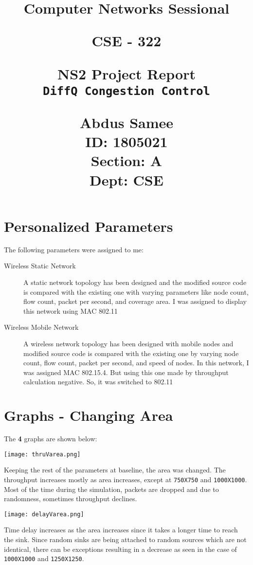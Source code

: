 \documentclass{article}
\title{%
  \begin{center}
        \vspace*{1cm}
            
        \Huge
        \textbf{Computer Networks Sessional}
            
        \vspace{0.5cm}
        \LARGE
        CSE - 322
            
        \vspace{1.5cm}
            
        \textbf{NS2 Project Report}\\
        \vspace{1cm}
        \Huge
        \texttt{DiffQ Congestion Control}
                        
        \vspace{0.8cm}
                        
        \Large
        Abdus Samee\\
        ID: 1805021\\
        Section: A\\
        Dept: CSE\\
    \end{center}
  }
\date{}
\begin{document}
\maketitle
\newpage

\section{Personalized Parameters}
The following parameters were assigned to me:

\begin{description}
     \item[Wireless Static Network] A static network topology has been designed and the modified source code is compared with the existing one with varying parameters like node count, flow count, packet per second, and coverage area. I was assigned to display this network using MAC 802.11
 \end{description}
 \begin{description}
     \item[Wireless Mobile Network] A wireless network topology has been designed with mobile nodes and modified source code is compared with the existing one by varying node count, flow count, packet per second, and speed of nodes. In this network, I was assigned MAC 802.15.4. But using this one made by throughput calculation negative. So, it was switched to 802.11
 \end{description}

\section{Graphs - Changing Area}
The \textbf{4} graphs are shown below:

\newpage

\begin{center}
    \texttt{[image: thruVarea.png]}
\end{center}

Keeping the rest of the parameters at baseline, the area was changed. The throughput increases mostly as area increases, except at \texttt{750X750} and \texttt{1000X1000}. Most of the time during the simulation, packets are dropped and due to randomness, sometimes throughput declines.

\begin{center}
    \texttt{[image: delayVarea.png]}
\end{center}

Time delay increases as the area increases since it takes a longer time to reach the sink. Since random sinks are being attached to random sources which are not identical, there can be exceptions resulting in a decrease as seen in the case of \texttt{1000X1000} and \texttt{1250X1250}.
\end{document}
